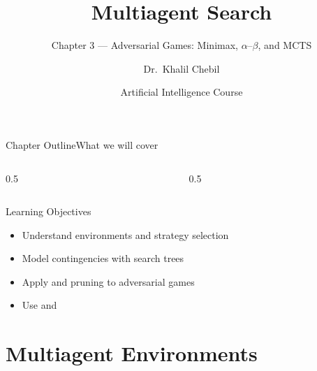 \documentclass[aspectratio=169,11pt]{beamer}
\title[Ch.\,3 — Multiagent Search]{Multiagent Search}
\subtitle{Chapter 3 — Adversarial Games: Minimax, $\alpha$–$\beta$, and MCTS}
\author{Dr.\ Khalil Chebil}
\date{Artificial Intelligence Course}
\begin{document}
{
\begin{frame}
  \titlepage
\end{frame}}

\begin{frame}{Chapter Outline}{What we will cover}
  \begin{columns}[T]
    \begin{column}{0.5\textwidth}
      \tableofcontents[sections={1-3}]
    \end{column}
    \begin{column}{0.5\textwidth}
      \tableofcontents[sections={4-6}]
    \end{column}
  \end{columns}
  \vfill
  \begin{block}{Learning Objectives}
    \begin{itemize}
      \item Understand  environments and strategy selection
      \item Model contingencies with  search trees
      \item Apply  and  pruning to adversarial games
      \item Use  and 
    \end{itemize}
  \end{block}
\end{frame}

\section{Multiagent Environments}
\end{document}
